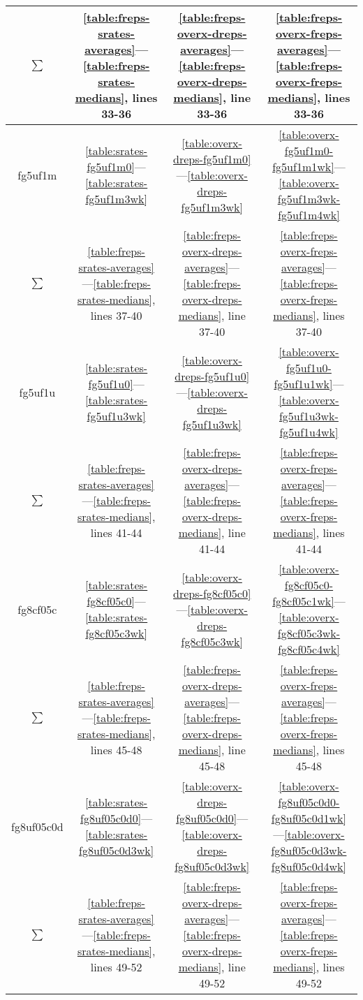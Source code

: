 \begin{table}
\begin{tabular}{|cccc|}
$\sum$ & \ref{table:freps-srates-averages}—\ref{table:freps-srates-medians}, lines 33-36 & \ref{table:freps-overx-dreps-averages}—\ref{table:freps-overx-dreps-medians}, line 33-36 & \ref{table:freps-overx-freps-averages}—\ref{table:freps-overx-freps-medians}, lines 33-36  \\
\hline
fg5uf1m & \ref{table:srates-fg5uf1m0}—\ref{table:srates-fg5uf1m3wk} & \ref{table:overx-dreps-fg5uf1m0}—\ref{table:overx-dreps-fg5uf1m3wk} & \ref{table:overx-fg5uf1m0-fg5uf1m1wk}—\ref{table:overx-fg5uf1m3wk-fg5uf1m4wk} \\
$\sum$ & \ref{table:freps-srates-averages}—\ref{table:freps-srates-medians}, lines 37-40 & \ref{table:freps-overx-dreps-averages}—\ref{table:freps-overx-dreps-medians}, line 37-40 & \ref{table:freps-overx-freps-averages}—\ref{table:freps-overx-freps-medians}, lines 37-40  \\
\hline
fg5uf1u & \ref{table:srates-fg5uf1u0}—\ref{table:srates-fg5uf1u3wk} & \ref{table:overx-dreps-fg5uf1u0}—\ref{table:overx-dreps-fg5uf1u3wk} & \ref{table:overx-fg5uf1u0-fg5uf1u1wk}—\ref{table:overx-fg5uf1u3wk-fg5uf1u4wk} \\
$\sum$ & \ref{table:freps-srates-averages}—\ref{table:freps-srates-medians}, lines 41-44 & \ref{table:freps-overx-dreps-averages}—\ref{table:freps-overx-dreps-medians}, line 41-44 & \ref{table:freps-overx-freps-averages}—\ref{table:freps-overx-freps-medians}, lines 41-44  \\
\hline
fg8cf05c & \ref{table:srates-fg8cf05c0}—\ref{table:srates-fg8cf05c3wk} & \ref{table:overx-dreps-fg8cf05c0}—\ref{table:overx-dreps-fg8cf05c3wk} & \ref{table:overx-fg8cf05c0-fg8cf05c1wk}—\ref{table:overx-fg8cf05c3wk-fg8cf05c4wk} \\
$\sum$ & \ref{table:freps-srates-averages}—\ref{table:freps-srates-medians}, lines 45-48 & \ref{table:freps-overx-dreps-averages}—\ref{table:freps-overx-dreps-medians}, line 45-48 & \ref{table:freps-overx-freps-averages}—\ref{table:freps-overx-freps-medians}, lines 45-48  \\
\hline
fg8uf05c0d & \ref{table:srates-fg8uf05c0d0}—\ref{table:srates-fg8uf05c0d3wk} & \ref{table:overx-dreps-fg8uf05c0d0}—\ref{table:overx-dreps-fg8uf05c0d3wk} & \ref{table:overx-fg8uf05c0d0-fg8uf05c0d1wk}—\ref{table:overx-fg8uf05c0d3wk-fg8uf05c0d4wk} \\
$\sum$ & \ref{table:freps-srates-averages}—\ref{table:freps-srates-medians}, lines 49-52 & \ref{table:freps-overx-dreps-averages}—\ref{table:freps-overx-dreps-medians}, line 49-52 & \ref{table:freps-overx-freps-averages}—\ref{table:freps-overx-freps-medians}, lines 49-52  \\

\end{tabular}
\end{table}
